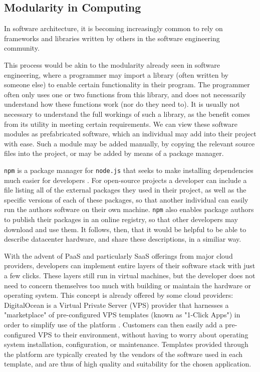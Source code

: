 \documentclass[11pt]{article}
\begin{document}
	
	\subsection{Modularity in Computing}
		In software architecture, it is becoming increasingly common to rely on frameworks and libraries written by others in the software engineering community. 

		This process would be akin to the modularity already seen in software engineering, where a programmer may import a library (often written by someone else) to enable certain functionality in their program. 
		The programmer often only uses one or two functions from this library, and does not necessarily understand how these functions work (nor do they need to).
		It is usually not necessary to understand the full workings of such a library, as the benefit comes from its utility in meeting certain requirements. 
		We can view these software modules as prefabricated software, which an individual may add into their project with ease. 
		Such a module may be added manually, by copying the relevant source files into the project, or may be added by means of a package manager.
		
		\verb|npm| is a package manager for \verb|node.js| that seeks to make installing dependencies much easier for developers \cite{Wittern2016}.
		For open-source projects a developer can include a file listing all of the external packages they used in their project, as well as the specific versions of each of these packages, so that another individual can easily run the authors software on their own machine.
		\verb|npm| also enables package authors to publish their packages in an online registry, so that other developers may download and use them.
		It follows, then, that it would be helpful to be able to describe datacenter hardware, and share these descriptions, in a similiar way. 

		With the advent of PaaS and particularly SaaS offerings from major cloud providers, developers can implement entire layers of their software stack with just a few clicks. 
		These layers still run in virtual machines, but the developer does not need to concern themselves too much with building or maintain the hardware or operating system.
		This concept is already offered by some cloud providers: DigitalOcean is a Virtual Private Server (VPS) provider that harnesses a "marketplace" of pre-configured VPS templates (known as "1-Click Apps") in order to simplify use of the platform \cite{DigitalOcean2020}. 
		Customers can then easily add a pre-configured VPS to their environment, without having to worry about operating system installation, configuration, or maintenance. 
		Templates provided through the platform are typically created by the vendors of the software used in each template, and are thus of high quality and suitability for the chosen application.
\end{document}
